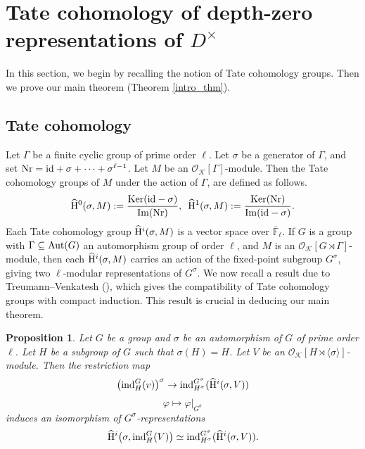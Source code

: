 \documentclass[10pt, reqno]{amsart}
\theoremstyle{plain}
\numberwithin{equation}{section}
\newtheorem{proposition}[theorem]{Proposition}
\begin{document}
\section{Tate cohomology of depth-zero representations of $D^\times$}
In this section, we begin by recalling the notion of Tate cohomology groups. Then we prove our main theorem (Theorem \ref{intro_thm}).
\subsection{Tate cohomology}
Let $\Gamma$ be a finite cyclic group of prime order $\ell$. Let $\sigma$ be a generator of $\Gamma$, and set ${\rm Nr}={\rm id}+\sigma+\cdots+\sigma^{\ell-1}$. Let $M$ be an $\mathcal{O}_{\mathcal{K}}[\Gamma]$-module. Then the Tate cohomology groups of $M$ under the action of $\Gamma$, are defined as follows.
$$ \widehat{\rm H}^0(\sigma,M) := \dfrac{{\rm Ker}({\rm id}-\sigma)}{{\rm Im}({\rm Nr})}, \,\,\, \widehat{\rm H}^1(\sigma,M) := \dfrac{{\rm Ker}({\rm Nr})}{{\rm Im}({\rm id}-\sigma)}. $$
Each Tate cohomology group $\widehat{\rm H}^i(\sigma,M)$ is a vector space over $\overline{\mathbb{F}}_\ell$. If $G$ is a group with $\Gamma\subseteq {\rm Aut}(G)$ an automorphism group of order $\ell$, and $M$ is an $\mathcal{O}_{\mathcal{K}}[G\rtimes \Gamma]$-module, then each $\widehat{\rm H}^i(\sigma,M)$ carries an action of the fixed-point subgroup $G^\sigma$, giving two $\ell$-modular representations of $G^\sigma$. We now recall a result due to Treumann--Venkatesh (\cite[Proposition 3.3.1]{TV_paper}), which gives the compatibility of Tate cohomology groups with compact induction. This result is crucial in deducing our main theorem. 
\begin{proposition}\label{TV_isom}
Let $G$ be a group and $\sigma$ be an automorphism of $G$ of prime order $\ell$. Let $H$ be a subgroup of $G$ such that $\sigma(H) = H$. Let $V$ be an $\mathcal{O}_{\mathcal{K}}[H\rtimes \langle\sigma\rangle]$-module. Then the restriction map 
$$ \big({\rm ind}_H^G(v)\big)^\sigma \rightarrow {\rm ind}_{H^\sigma}^{G^\sigma}(\widehat{\rm H}^i(\sigma, V)) $$
$$ \varphi\mapsto \varphi|_{G^\sigma} $$
induces an isomorphism of $G^\sigma$-representations
$$ \widehat{\rm H}^i\big(\sigma, {\rm ind}_H^G(V)\big) \simeq 
{\rm ind}_{H^\sigma}^{G^\sigma}(\widehat{\rm H}^i(\sigma,V)). $$ 
\end{proposition}
\end{document}
